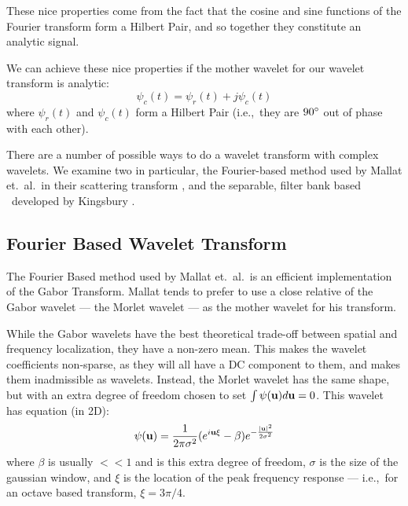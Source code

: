   These nice properties come from the fact that the cosine and sine functions of the
  Fourier transform form a Hilbert Pair, and so together they constitute an 
  analytic signal.

  We can achieve these nice properties if the mother wavelet for our wavelet
  transform is analytic:
  \begin{equation}
    \psi_{c}(t) = \psi_{r}(t) + j\psi_{c}(t) \label{eq:complex_wavelet}
  \end{equation}
  where $\psi_{r}(t)$ and $\psi_{c}(t)$ form a Hilbert Pair (i.e.,\ they are
  $90{^{\circ}}$ out of phase with each other).

  There are a number of possible ways to do a wavelet transform with complex
  wavelets. We examine two in particular, the Fourier-based method used by
  Mallat et.\ al.\ in their scattering transform
  \citep{bruna_classification_2011, bruna_invariant_2013, bruna_scattering_2013,
  oyallon_generic_2013, oyallon_deep_2015, sifre_rotation_2013,
  sifre_rigid-motion_2014, sifre_rigid-motion_2014-1, sifre_scatnet_2013}, and
  the separable, filter bank based \DTCWT\ developed by Kingsbury
  \citep{kingsbury_wavelet_1997, kingsbury_dual-tree_1998,
  kingsbury_dual-tree_1998-1,  kingsbury_image_1999, kingsbury_shift_1999,
  kingsbury_dual-tree_2000, kingsbury_complex_2001, selesnick_dual-tree_2005}.

\subsection{Fourier Based Wavelet Transform}\label{sec:morlet_fourier}
  The Fourier Based method used by Mallat et.\ al.\ is an efficient
  implementation of the Gabor Transform. Mallat tends to prefer to use a close
  relative of the Gabor wavelet --- the Morlet wavelet --- as the mother wavelet
  for his transform. 
  
  While the Gabor wavelets have the best theoretical trade-off between spatial
  and frequency localization, they have a non-zero mean.  This makes the
  wavelet coefficients non-sparse, as they will all have a DC component to
  them, and makes them inadmissible as wavelets. Instead, the Morlet wavelet
  has the same shape, but with an extra degree of freedom chosen to set $\int
  \psi (\mathbf{u}) d\mathbf{u} =0$.  This wavelet has equation (in 2D):
  \begin{equation}
    \psi(\mathbf{u}) = \frac{1}{2\pi\sigma^2} {(e^{i\mathbf{u}\xi} - \beta)}
                     e^{-\frac{|\mathbf{u}|^2}{2\sigma^2}} 
    \label{eq:morlet}
  \end{equation}
  where $\beta$ is usually $<<1$ and is this extra degree of freedom, 
  $\sigma$ is the size of the gaussian window, and $\xi$ is the
  location of the peak frequency response --- i.e.,\ for an octave based
  transform, $\xi = 3\pi/4$.

